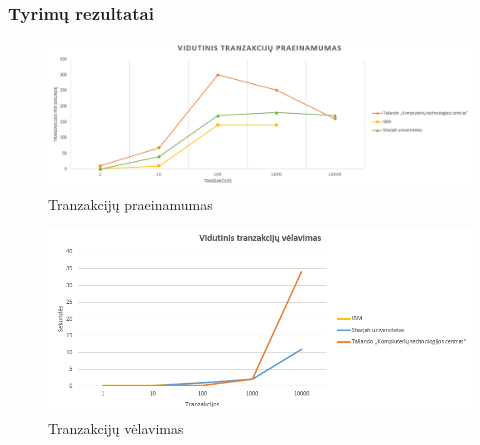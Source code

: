 \documentclass{VUMIFPSkursinis}
\begin{document}
		\subsubsection{Tyrimų rezultatai}
\begin{figure}[H]
    \centering
    \includegraphics[scale=0.5]{img/Praein}
    \caption{Tranzakcijų praeinamumas}   %
    \label{img:mlp}
\end{figure}		
\begin{figure}[H]
    \centering
    \includegraphics[scale=0.5]{img/Velav}
    \caption{Tranzakcijų vėlavimas}   %
    \label{img:mlp}
\end{figure}		
\end{document}
